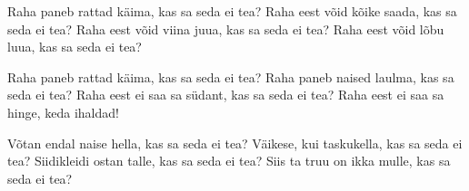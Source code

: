 Raha paneb rattad k\"aima, kas sa seda ei tea?
Raha eest v\~oid k\~oike saada, kas sa seda ei tea?
Raha eest v\~oid viina juua, kas sa seda ei tea?
Raha eest v\~oid l\~obu luua, kas sa seda ei tea?

Raha paneb rattad k\"aima, kas sa seda ei tea?
Raha paneb naised laulma, kas sa seda ei tea?
Raha eest ei saa sa s\"udant, kas sa seda ei tea?
Raha eest ei saa sa hinge, keda ihaldad!

V\~otan endal naise hella, kas sa seda ei tea?
V\"aikese, kui taskukella, kas sa seda ei tea?
Siidikleidi ostan talle, kas sa seda ei tea?
Siis ta truu on ikka mulle, kas sa seda ei tea?